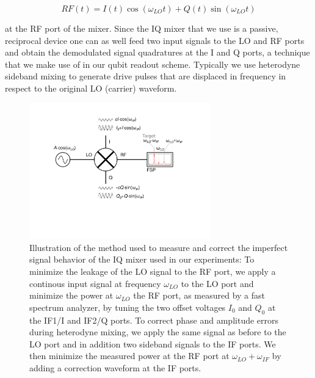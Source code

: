 \begin{equation}
RF(t) = I(t)\cos{(\omega_{LO} t)}+Q(t)\sin{(\omega_{LO} t)} \label{eq:iqMixer}
\end{equation}

at the RF port of the mixer. Since the IQ mixer that we use is a passive, reciprocal device one can as well feed two input signals to the LO and RF ports and obtain the demodulated signal quadratures at the I and Q ports, a technique that we make use of in our qubit readout scheme. Typically we use heterodyne sideband mixing to generate drive pulses that are displaced in frequency in respect to the original LO (carrier) waveform.

\begin{figure}[ht!]
	\centering
		\includegraphics[width=0.7\textwidth]{"./material/figures/measurement/mixer_imperfections"}
	\caption[...]{Illustration of the method used to measure and correct the imperfect signal behavior of the IQ mixer used in our experiments: To minimize the leakage of the LO signal to the RF port, we apply a continous input signal at frequency $\omega_{LO}$ to the LO port and minimize the power at $\omega_{LO}$ the RF port, as measured by a fast spectrum analyzer, by tuning the two offset voltages $I_0$ and $Q_0$ at the IF1/I and IF2/Q ports. To correct phase and amplitude errors during heterodyne mixing, we apply the same signal as before to the LO port and in addition two sideband signals to the IF ports. We then minimize the measured power at the RF port at $\omega_{LO}+\omega_{IF}$ by adding a correction waveform at the IF ports.}
	\label{fig:iq_mixer_correction}
\end{figure}

